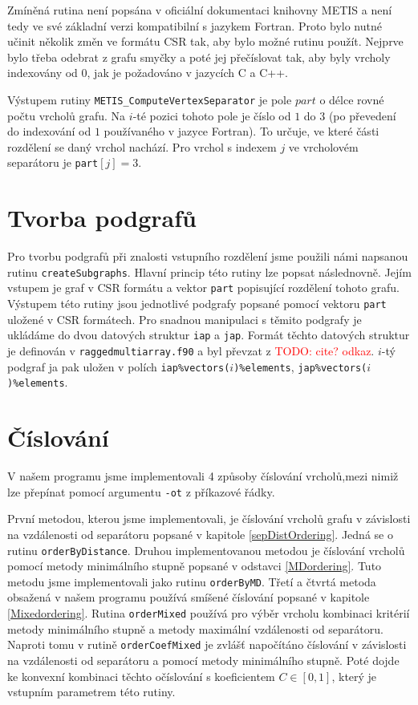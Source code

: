\documentclass[11pt,american,czech,oneside]{book}
\theoremstyle{plain}
\theoremstyle{definition}
\newcommand{\TODO}[1]{\textcolor{red}{TODO: #1}}
\begin{document}
Zmíněná rutina není popsána v oficiální dokumentaci knihovny METIS a není tedy ve své základní verzi kompatibilní s jazykem Fortran. Proto bylo nutné učinit několik změn ve formátu CSR tak, aby bylo možné rutinu použít. Nejprve bylo třeba odebrat z grafu smyčky a poté jej přečíslovat tak, aby byly vrcholy indexovány od 0, jak je požadováno v jazycích C a C++.

Výstupem rutiny \texttt{METIS\_ComputeVertexSeparator} je pole $part$ o délce rovné počtu vrcholů grafu. Na $i$-té pozici tohoto pole je číslo od $1$ do $3$ (po převedení do indexování od $1$ používaného v jazyce Fortran). To určuje, ve které části rozdělení se daný vrchol nachází. Pro vrchol s indexem $j$ ve vrcholovém separátoru je \texttt{part}$[j] = 3$.

\section{Tvorba podgrafů}
Pro tvorbu podgrafů při znalosti vstupního rozdělení jsme použili námi napsanou rutinu \texttt{createSubgraphs}. Hlavní princip této rutiny lze popsat následnovně. Jejím vstupem je graf v CSR formátu a vektor \texttt{part} popisující rozdělení tohoto grafu. Výstupem této rutiny jsou jednotlivé podgrafy popsané pomocí vektoru \texttt{part} uložené v CSR formátech. Pro snadnou manipulaci s těmito podgrafy je ukládáme do dvou datových struktur \texttt{iap} a \texttt{jap}. Formát těchto datových struktur je definován v \texttt{raggedmultiarray.f90} a byl převzat z \TODO{cite? odkaz}. $i$-tý podgraf ja pak uložen v polích \texttt{iap\%vectors($i$)\%elements}, \texttt{jap\%vectors($i$)\%elements}.


\section{Číslování}
V našem programu jsme implementovali 4 způsoby číslování vrcholů,mezi nimiž lze přepínat pomocí argumentu \texttt{-ot} z příkazové řádky.

První metodou, kterou jsme implementovali, je číslování vrcholů grafu v závislosti na vzdálenosti od separátoru popsané v kapitole \ref{sepDistOrdering}. Jedná se o rutinu \texttt{orderByDistance}. Druhou implementovanou metodou je číslování vrcholů pomocí metody minimálního stupně popsané v odstavci \ref{MDordering}. Tuto metodu jsme implementovali jako rutinu \texttt{orderByMD}. Třetí a čtvrtá metoda obsažená v našem programu používá smíšené číslování popsané v kapitole \ref{Mixedordering}. Rutina \texttt{orderMixed} používá pro výběr vrcholu kombinaci kritérií metody minimálního stupně a metody maximální vzdálenosti od separátoru. Naproti tomu v rutině \texttt{orderCoefMixed} je zvlášť napočítáno číslování v závislosti na vzdálenosti od separátoru a pomocí metody minimálního stupně. Poté dojde ke konvexní kombinaci těchto očíslování s koeficientem $C \in [0,1]$, který je vstupním parametrem této rutiny.
\end{document}
